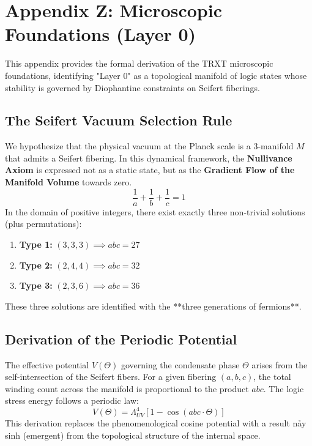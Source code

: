 \section{Appendix Z: Microscopic Foundations (Layer 0)}
\label{app:microscopic_foundations}

This appendix provides the formal derivation of the TRXT microscopic foundations, identifying "Layer 0" as a topological manifold of logic states whose stability is governed by Diophantine constraints on Seifert fiberings.

\subsection{The Seifert Vacuum Selection Rule}
We hypothesize that the physical vacuum at the Planck scale is a 3-manifold $M$ that admits a Seifert fibering. In this dynamical framework, the \textbf{Nullivance Axiom} is expressed not as a static state, but as the \textbf{Gradient Flow of the Manifold Volume} towards zero.
\begin{equation}
    \frac{1}{a} + \frac{1}{b} + \frac{1}{c} = 1
\end{equation}
In the domain of positive integers, there exist exactly three non-trivial solutions (plus permutations):
\begin{enumerate}
    \item \textbf{Type 1:} $(3, 3, 3) \implies abc = 27$
    \item \textbf{Type 2:} $(2, 4, 4) \implies abc = 32$
    \item \textbf{Type 3:} $(2, 3, 6) \implies abc = 36$
\end{enumerate}
These three solutions are identified with the **three generations of fermions**.

\subsection{Derivation of the Periodic Potential}
The effective potential $V(\Theta)$ governing the condensate phase $\Theta$ arises from the self-intersection of the Seifert fibers. For a given fibering $(a, b, c)$, the total winding count across the manifold is proportional to the product $abc$. The logic stress energy follows a periodic law:
\begin{equation}
    V(\Theta) = \Lambda_{UV}^4 \left[ 1 - \cos(abc \cdot \Theta) \right]
\end{equation}
This derivation replaces the phenomenological cosine potential with a result nảy sinh (emergent) from the topological structure of the internal space.

